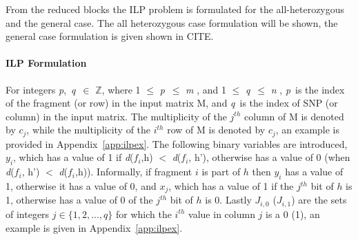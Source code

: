 \documentclass[10pt,a4paer,twocolumn]{article}
\newcommand{\M}{\textit{m }}
\newcommand{\N}{\textit{n }}
\newcommand{\D}{\textit{d}}
\newcommand{\PP}{\textit{p}}
\newcommand{\QQ}{\textit{q}}
\begin{document}
From the reduced blocks the ILP problem is formulated for the all-heterozygous and the general case. The
all heterozygous case formulation will be shown, the general case formulation is given shown in CITE. 

\paragraph{ILP Formulation} \label{ssec:ilpform}

For integers \PP,\ \QQ\ $\in$ $\mathbb{Z}$, where 1 $\le$ \PP\ $\le$ \M, and 1 $\le$ \QQ\ $\le$ \N, \PP\ is the 
index of the fragment (or row) in the input matrix M, and \QQ\ is the index of SNP (or column) in the input 
matrix. The multiplicity of the $j^{th}$ column of M is denoted by $c_j$, while the multiplicity of the
$i^{th}$ row of M is denoted by $c_j$, an example is provided in Appendix~\ref{app:ilpex}. The following 
binary variables are introduced, $y_i$, which has a value of 1 if \D($f_i$,h) $<$ \D($f_i$, h'), otherwise 
has a value of 0 (when \D($f_i$, h') $<$ \D($f_i$,h)). Informally, if fragment $i$ is part of $h$ then $y_i$ 
has a value of 1, otherwise it has a value of 0, and $x_j$, which has a value of 1 if the $j^{th}$ bit of 
$h$ is 1, otherwise has a value of 0 of the $j^{th}$ bit of $h$ is 0. 
Lastly $J_{i,0}$ ($J_{i,1}$) are the sets of integers $j \in \{1,2,...,q\}$ for which 
the $i^{th}$ value in column $j$ is a 0 (1), an example is given in Appendix~\ref{app:ilpex}.
\end{document}
